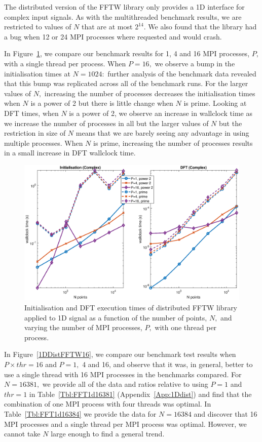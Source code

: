 \documentclass[a4paper]{article}
\begin{document}
The distributed version of the FFTW library only
provides a 1D interface for complex input signals. As with the
multithreaded benchmark results, we are restricted to values of $N$
that are at most $2^{14}.$ We also found that the library had a bug
when 12 or 24 MPI processes where requested and would crash.

In Figure~\ref{1DDistFFTW}, we compare our benchmark results for 1, 4
and 16 MPI processes, $P,$ with a single thread per process. When
$P=16,$ we observe a bump in the initialisation times at $N=1024:$
further analysis of the benchmark data revealed that this bump was
replicated across all of the benchmark runs. For the larger values of
$N,$ increasing the number of processes decreases the initialisation
times when $N$ is a power of 2 but there is little change when $N$ is
prime. Looking at DFT times, when $N$ is a power of 2, we observe an
increase in wallclock time as we increase the number of processes in
all but the larger values of $N$ but the restriction in size of $N$
means that we are barely seeing any advantage in using multiple
processes. When $N$ is prime, increasing the number of processes
results in a small increase in DFT wallclock time.


\begin{figure}[htb]
    \centering
    \includegraphics[width=0.9\linewidth]{../results/fftw_1d_mpi.eps}
  \caption{Initialisation and DFT execution times of distributed FFTW library applied to 1D signal as a function of the
    number of points, $N,$ and varying the number of MPI processes, $P,$ with one thread per process.}
  \label{1DDistFFTW}
\end{figure}

In Figure~\ref{1DDistFFTW16}, we compare our benchmark test results
when $P\times thr=16$ and $P=1,$ 4 and 16, and observe that it was, in
general, better to use a single thread with 16 MPI processes in the
benchmarks compared. For $N=16381,$ we provide all of the data and
ratios relative to using $P=1$ and $thr=1$ in
Table~\ref{Tbl:FFT1d16381} (Appendix~\ref{App:1Ddist}) and find that the combination of one MPI
process with four threads was optimal. In Table~\ref{Tbl:FFT1d16384}
we provide the data for $N=16384$ and discover that 16 MPI processes
and a single thread per MPI process was optimal. However, we cannot
take $N$ large enough to find a general trend.
\end{document}
